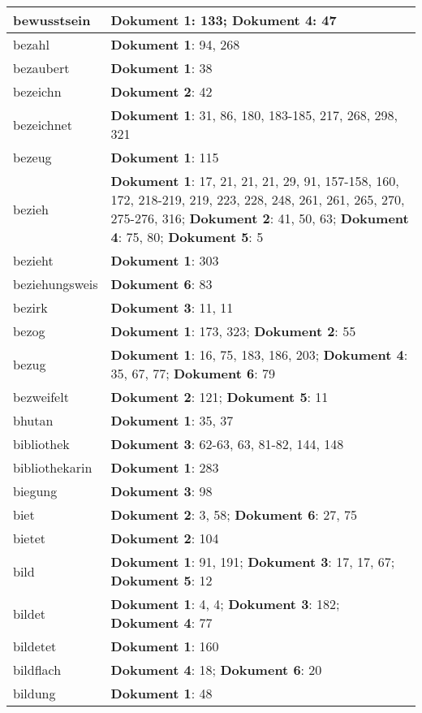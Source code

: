 \documentclass[a5paper]{article}
\begin{document}
\begin{longtable}[l]{|l|p{3in}|}
\hline
bewusstsein & \textbf{Dokument 1}: 133; \textbf{Dokument 4}: 47 \\
\hline
bezahl & \textbf{Dokument 1}: 94, 268 \\
\hline
bezaubert & \textbf{Dokument 1}: 38 \\
\hline
bezeichn & \textbf{Dokument 2}: 42 \\
\hline
bezeichnet & \textbf{Dokument 1}: 31, 86, 180, 183-185, 217, 268, 298, 321 \\
\hline
bezeug & \textbf{Dokument 1}: 115 \\
\hline
bezieh & \textbf{Dokument 1}: 17, 21, 21, 21, 29, 91, 157-158, 160, 172, 218-219, 219, 223, 228, 248, 261, 261, 265, 270, 275-276, 316; \textbf{Dokument 2}: 41, 50, 63; \textbf{Dokument 4}: 75, 80; \textbf{Dokument 5}: 5 \\
\hline
bezieht & \textbf{Dokument 1}: 303 \\
\hline
beziehungsweis & \textbf{Dokument 6}: 83 \\
\hline
bezirk & \textbf{Dokument 3}: 11, 11 \\
\hline
bezog & \textbf{Dokument 1}: 173, 323; \textbf{Dokument 2}: 55 \\
\hline
bezug & \textbf{Dokument 1}: 16, 75, 183, 186, 203; \textbf{Dokument 4}: 35, 67, 77; \textbf{Dokument 6}: 79 \\
\hline
bezweifelt & \textbf{Dokument 2}: 121; \textbf{Dokument 5}: 11 \\
\hline
bhutan & \textbf{Dokument 1}: 35, 37 \\
\hline
bibliothek & \textbf{Dokument 3}: 62-63, 63, 81-82, 144, 148 \\
\hline
bibliothekarin & \textbf{Dokument 1}: 283 \\
\hline
biegung & \textbf{Dokument 3}: 98 \\
\hline
biet & \textbf{Dokument 2}: 3, 58; \textbf{Dokument 6}: 27, 75 \\
\hline
bietet & \textbf{Dokument 2}: 104 \\
\hline
bild & \textbf{Dokument 1}: 91, 191; \textbf{Dokument 3}: 17, 17, 67; \textbf{Dokument 5}: 12 \\
\hline
bildet & \textbf{Dokument 1}: 4, 4; \textbf{Dokument 3}: 182; \textbf{Dokument 4}: 77 \\
\hline
bildetet & \textbf{Dokument 1}: 160 \\
\hline
bildflach & \textbf{Dokument 4}: 18; \textbf{Dokument 6}: 20 \\
\hline
bildung & \textbf{Dokument 1}: 48 \\

\end{longtable}
\end{document}
